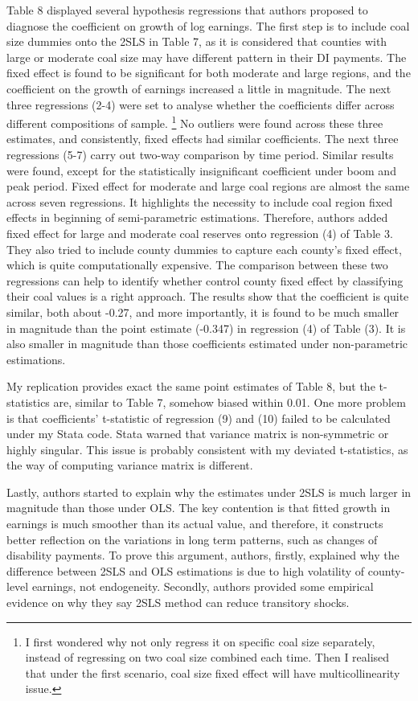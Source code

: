 \documentclass{article} %
\begin{document}
Table 8 displayed several hypothesis regressions that authors proposed to diagnose the coefficient on growth of log earnings. The first step is to include coal size dummies onto the 2SLS in Table 7, as it is considered that counties with large or moderate coal size may have different pattern in their DI payments. The fixed effect is found to be significant for both moderate and large regions, and the coefficient on the growth of earnings increased a little in magnitude. The next three regressions (2-4) were set to analyse whether the coefficients differ across different compositions of sample. 
\footnote{I first wondered why not only regress it on specific coal size separately, instead of regressing on two coal size combined each time. Then I realised that under the first scenario, coal size fixed effect will have multicollinearity issue.} 
No outliers were found across these three estimates, and consistently, fixed effects had similar coefficients. The next three regressions (5-7) carry out two-way comparison by time period. Similar results were found, except for the statistically insignificant coefficient under boom and peak period. Fixed effect for moderate and large coal regions are almost the same across seven regressions. It highlights the necessity to include coal region fixed effects in beginning of semi-parametric estimations. Therefore, authors added fixed effect for large and moderate coal reserves onto regression (4) of Table 3. They also tried to include county dummies to capture each county's fixed effect, which is quite computationally expensive. The comparison between these two regressions can help to identify whether control county fixed effect by classifying their coal values is a right approach. The results show that the coefficient is quite similar, both about -0.27, and more importantly, it is found to be much smaller in magnitude than the point estimate (-0.347) in regression (4) of Table (3). It is also smaller in magnitude than those coefficients estimated under non-parametric estimations. 

My replication provides exact the same point estimates of Table 8, but the t-statistics are, similar to Table 7, somehow biased within 0.01. One more problem is that coefficients' t-statistic of regression (9) and (10) failed to be calculated under my Stata code. Stata warned that variance matrix is non-symmetric or highly singular. This issue is probably consistent with my deviated t-statistics, as the way of computing variance matrix is different. 

Lastly, authors started to explain why the estimates under 2SLS is much larger in magnitude than those under OLS. The key contention is that fitted growth in earnings is much smoother than its actual value, and therefore, it constructs better reflection on the variations in long term patterns, such as changes of disability payments. To prove this argument, authors, firstly, explained why the difference between 2SLS and OLS estimations is due to high volatility of county-level earnings, not endogeneity. Secondly, authors provided some empirical evidence on why they say 2SLS method can reduce transitory shocks. 
\end{document}
